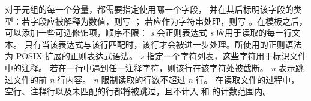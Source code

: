 \noindent 对于元组的每一个分量，都需要指定使用哪一个字段，
并在其后标明该字段的类型：若字段应被解释为数值，则写 ；
若应作为字符串处理，则写 。在模板之后，
可以添加一些可选修饰项，顺序不限：
 \emph{s} 会正则表达式 \emph{s} 应用于读取的每一行文本。
只有当该表达式与该行匹配时，该行才会被进一步处理。所使用的正则语法为 
POSIX 扩展的正则表达式语法。
 \emph{s} 指定一个字符列表，这些字符用于标识文件中的注释。
若在一行中遇到任一注释字符，则该行在该字符处被截断。
 \emph{n} 表示跳过文件的前 \emph{n} 行内容。
 \emph{n} 限制读取的行数不超过 \emph{n} 行。
在读取文件的过程中，空行、注释行以及未匹配的行都将被跳过，且不计入
 和  的计数范围内。

